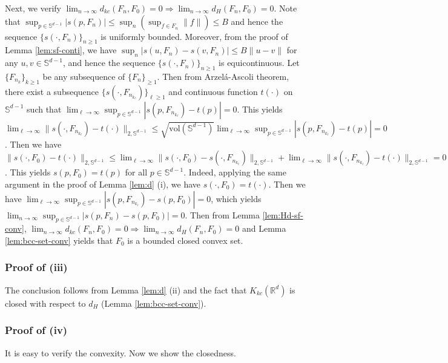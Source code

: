 \documentclass[11pt,reqno]{amsart}
\begin{document}
Next, we verify $\lim_{n \to \infty}d_{kc}(F_n,F_0) = 0 \Rightarrow \lim_{n \to \infty}d_H(F_n,F_0) = 0$. Note that $\sup_{p \in \mathbb{S}^{d-1}}|s(p,F_n)| \leq \sup_n(\sup_{f \in F_n}\|f\|)\leq B$ and hence the sequence $\{s(\cdot, F_n)\}_{n \geq 1}$ is uniformly bounded. Moreover, from the proof of Lemma \ref{lem:sf-conti}, we have $\sup_n|s(u,F_n) - s(v,F_n)| \leq B\|u-v\|$ for any $u,v \in \mathbb{S}^{d-1}$, and hence the sequence $\{s(\cdot, F_n)\}_{n \geq 1}$ is equicontinuous. Let $\{F_{n_k}\}_{k\geq 1}$ be any subsequence of $\{F_n\}_{\geq 1}$. Then from Arzel\'a-Ascoli theorem, there exist a subsequence $\{s(\cdot, F_{n_{k_\ell}})\}_{\ell \geq 1}$ and continuous function $t(\cdot)$ on $\mathbb{S}^{d-1}$ such that $\lim_{\ell \to \infty}\sup_{p \in \mathbb{S}^{d-1}}|s(p,F_{n_{k_\ell}}) - t(p)| = 0$. This yields $\lim_{\ell \to \infty}\|s(\cdot,F_{n_{k_\ell}}) -t(\cdot)\|_{2,\mathbb{S}^{d-1}} \leq \sqrt{\mathrm{vol}(\mathbb{S}^{d-1})}\lim_{\ell \to \infty}\sup_{p \in \mathbb{S}^{d-1}}|s(p,F_{n_{k_\ell}}) - t(p)| = 0$. Then we have $\|s(\cdot,F_0) -t(\cdot)\|_{2,\mathbb{S}^{d-1}}
\leq \lim_{\ell \to \infty}\|s(\cdot,F_0) -s(\cdot, F_{n_{k_\ell}})\|_{2,\mathbb{S}^{d-1}} + \lim_{\ell \to \infty}\|s(\cdot,F_{n_{k_\ell}}) -t(\cdot)\|_{2,\mathbb{S}^{d-1}} = 0$. This yields $s(p, F_0) = t(p)$ for all $p \in \mathbb{S}^{d-1}$.  Indeed, applying the same argument in the proof of Lemma \ref{lem:d} (i), we have $s(\cdot, F_0) = t(\cdot)$. Then we have $\lim_{\ell \to \infty}\sup_{p \in \mathbb{S}^{d-1}}|s(p,F_{n_{k_\ell}}) - s(p,F_0)| = 0$, which yields $\lim_{n \to \infty}\sup_{p \in \mathbb{S}^{d-1}}|s(p,F_n) - s(p,F_0)| = 0$. Then from Lemma \ref{lem:Hd-sf-conv}, $\lim_{n \to \infty}d_{kc}(F_n,F_0) = 0 \Rightarrow \lim_{n \to \infty}d_H(F_n,F_0) = 0$ and Lemma \ref{lem:bcc-set-conv} yields that $F_0$ is a bounded closed convex set. 

\subsubsection{Proof of (iii)}

The conclusion follows from Lemma \ref{lem:d} (ii) and the fact that $K_{kc}(\mathbb{R}^d)$ is closed with respect to $d_H$ (Lemma \ref{lem:bcc-set-conv}). 

\subsubsection{Proof of (iv)}

It is easy to verify the convexity. Now we show the closedness. 
\end{document}
